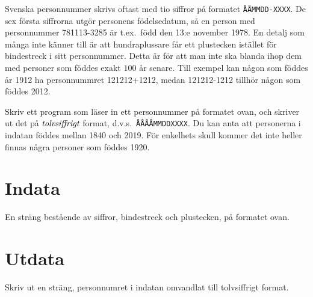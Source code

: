 
Svenska personnummer skrivs oftast med tio siffror på formatet \texttt{ÅÅMMDD-XXXX}. De sex första siffrorna utgör personens födelsedatum, så en
person med personnummer 781113-3285 är t.ex.\ född den 13:e november 1978. En detalj som många
inte känner till är att hundraplussare får ett plustecken istället för bindestreck i sitt 
personnummer. Detta är för att man inte ska blanda ihop dem med personer som föddes exakt $100$
år senare. Till exempel kan någon som föddes år 1912 ha personnummret 121212+1212, medan 
121212-1212 tillhör någon som föddes 2012. 

Skriv ett program som läser in ett personnummer på formatet ovan,
och skriver ut det på $\emph{tolvsiffrigt}$ format, d.v.s.\ \texttt{ÅÅÅÅMMDDXXXX}.
Du kan anta att personerna i indatan föddes mellan 1840 och 2019.
För enkelhets skull kommer det inte heller finnas några personer som föddes 1920. 


\section*{Indata}
En sträng bestående av siffror, bindestreck och plustecken, på formatet ovan.

\section*{Utdata}
Skriv ut en sträng, personnumret i indatan omvandlat till tolvsiffrigt format.

